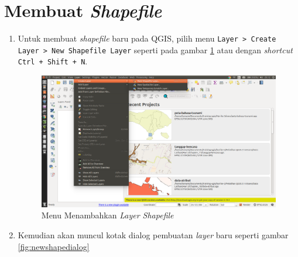 \section{Membuat \textit{Shapefile}}

\begin{enumerate}[1.]

  \item Untuk membuat \textit{shapefile} baru pada QGIS, pilih menu \texttt{Layer > Create Layer > New Shapefile Layer} seperti pada gambar \ref{fig:menunewshape} atau dengan \textit{shortcut} \texttt{Ctrl + Shift + N}.
  
  \begin{figure}[H]
    \centering
    \includegraphics[width=1\textwidth]{./resources/036-menu-new-shape}
    \caption{Menu Menambahkan \textit{Layer Shapefile}}
    \label{fig:menunewshape}
  \end{figure}
  
  \item Kemudian akan muncul kotak dialog pembuatan \textit{layer} baru seperti gambar \ref{fig:newshapedialog}
  

\end{enumerate}
